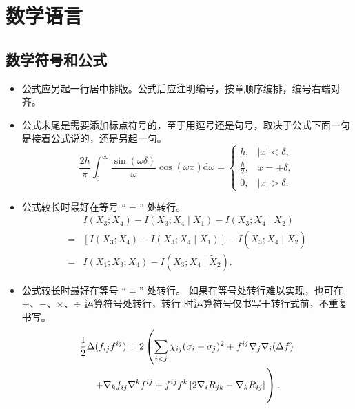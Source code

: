 
\chapter{数学语言}

\section{数学符号和公式}

\begin{itemize}
    \item 公式应另起一行居中排版。公式后应注明编号，按章顺序编排，编号右端对齐。
    \item 公式末尾是需要添加标点符号的，至于用逗号还是句号，取决于公式下面一句是接着公式说的，还是另起一句。
    \begin{equation}
  \frac{2h}{\pi}\int_{0}^{\infty}\frac{\sin\left( \omega\delta \right)}{\omega}
  \cos\left( \omega x \right) \mathrm{d}\omega = 
  \begin{cases}
    h, & \left| x \right| < \delta, \\
    \frac{h}{2}, & x = \pm \delta, \\
    0, & \left| x \right| > \delta.
  \end{cases}
\end{equation}
    \item 公式较长时最好在等号 ``$=$'' 处转行。
    \begin{align}
    & I (X_3; X_4) - I (X_3; X_4 \mid X_1) - I (X_3; X_4 \mid X_2) \nonumber \\
  = & [I (X_3; X_4) - I (X_3; X_4 \mid X_1)] - I (X_3; X_4 \mid \tilde{X}_2) \\
  = & I (X_1; X_3; X_4) - I (X_3; X_4 \mid \tilde{X}_2).
\end{align}
\item 公式较长时最好在等号 ``$=$'' 处转行。
如果在等号处转行难以实现，也可在 $+$、$-$、$\times$、$\div$ 运算符号处转行，转行
时运算符号仅书写于转行式前，不重复书写。
\begin{multline}
  \frac{1}{2} \Delta (f_{ij} f^{ij}) =
    2 \left(\sum_{i<j} \chi_{ij}(\sigma_{i} - \sigma_{j})^{2}
    + f^{ij} \nabla_{j} \nabla_{i} (\Delta f) \right. \\
  \left. + \nabla_{k} f_{ij} \nabla^{k} f^{ij} +
    f^{ij} f^{k} \left[2\nabla_{i}R_{jk}
    - \nabla_{k} R_{ij} \right] \vphantom{\sum_{i<j}} \right).
\end{multline}
\end{itemize}



